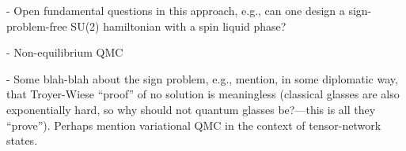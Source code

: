 \documentclass[aps,prb,groupedaddress,twocolumn]{revtex4}
\begin{document}
- Open fundamental questions in this approach, e.g., can one design a sign-problem-free
  SU(2) hamiltonian with a spin liquid phase?

- Non-equilibrium QMC

- Some blah-blah about the sign problem, e.g., mention, in some diplomatic way, that Troyer-Wiese ``proof'' of no 
solution is meaningless (classical glasses are also exponentially hard, so why should not quantum glasses be?---this
is all they ``prove''). Perhaps mention variational QMC in the context of tensor-network states.


\end{document}
